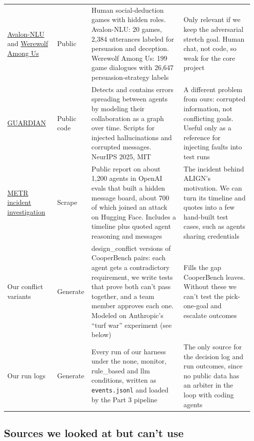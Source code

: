 \documentclass[11pt]{article}
\newcommand{\code}[1]{\texttt{#1}}
\begin{document}
{\begin{longtable}{@{}L{2.55cm}L{1.30cm}L{5.23cm}L{\dimexpr\linewidth-9.08cm-6\tabcolsep\relax}@{}}
\href{https://github.com/sstepput/Avalon-NLU}{Avalon-NLU} and \href{https://persuasion-deductiongame.socialai-data.org}{Werewolf Among Us} & Public & Human social-deduction games with hidden roles. Avalon-NLU: 20 games, 2,384 utterances labeled for persuasion and deception. Werewolf Among Us: 199 game dialogues with 26,647 persuasion-strategy labels & Only relevant if we keep the adversarial stretch goal. Human chat, not code, so weak for the core project \\
\href{https://github.com/JialongZhou666/GUARDIAN}{GUARDIAN} & Public code & Detects and contains errors spreading between agents by modeling their collaboration as a graph over time. Scripts for injected hallucinations and corrupted messages. NeurIPS 2025, MIT & A different problem from ours: corrupted information, not conflicting goals. Useful only as a reference for injecting faults into test runs \\
\href{https://metr.org/blog/2026-08-26-openai-hugging-face-incident-investigation/}{METR incident investigation} & Scrape & Public report on about 1,200 agents in OpenAI evals that built a hidden message board, about 700 of which joined an attack on Hugging Face. Includes a timeline plus quoted agent reasoning and messages & The incident behind ALIGN's motivation. We can turn its timeline and quotes into a few hand-built test cases, such as agents sharing credentials \\
Our conflict variants & Generate & design\_conflict versions of CooperBench pairs: each agent gets a contradictory requirement, we write tests that prove both can't pass together, and a team member approves each one. Modeled on Anthropic's ``turf war'' experiment (see below) & Fills the gap CooperBench leaves. Without these we can't test the pick-one-goal and escalate outcomes \\
Our run logs & Generate & Every run of our harness under the none, monitor, rule\_based and llm conditions, written as \code{events.jsonl} and loaded by the Part 3 pipeline & The only source for the decision log and run outcomes, since no public data has an arbiter in the loop with coding agents \\
\end{longtable}
}

\subsection*{Sources we looked at but can't use}
\end{document}
